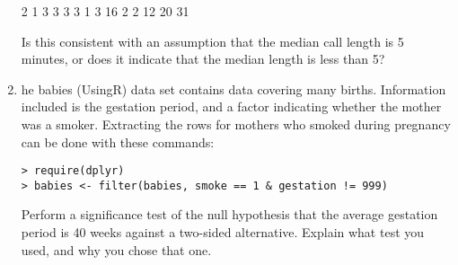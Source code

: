 \documentclass[11pt]{article}
\begin{document}
\begin{enumerate}
2 1 3 3 3 3 1 3 16 2 2 12 20 31 

Is this consistent with an assumption that the median call length is 5 minutes, or does it indicate that the median length is less than 5? 
\item he babies (UsingR) data set contains data covering many births. Information included is the gestation period, and a factor indicating whether the mother was a smoker. Extracting the rows for mothers who smoked during pregnancy can be done with these commands: 
\begin{verbatim}
> require(dplyr)
> babies <- filter(babies, smoke == 1 & gestation != 999)
\end{verbatim}
Perform a significance test of the null hypothesis that the average gestation period is 40 weeks against a two-sided alternative. Explain what test you used, and why you chose that one. 
  \end{enumerate}
\end{document}
